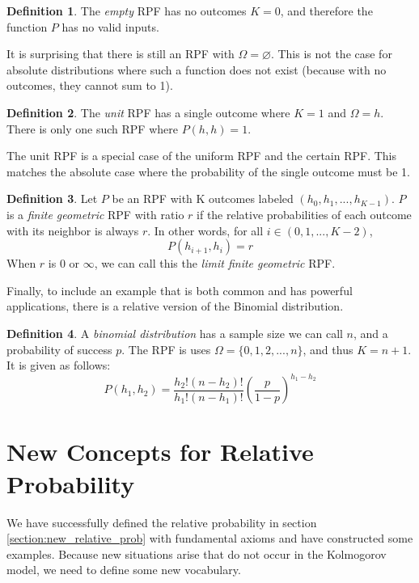 \documentclass[twoside]{article}
\theoremstyle{plain}%
\theoremstyle{definition}
\newtheorem{definition}{Definition}[section]
\theoremstyle{remark}
\begin{document}
\begin{definition}
\label{def:empty_rpf}
The \textit{empty} RPF has no outcomes \(K = 0\), and therefore the function \(P\) has no valid inputs.
\end{definition}

It is surprising that there is still an RPF with \(\Omega = \varnothing\). This is not the case for absolute distributions where such a function does not exist (because with no outcomes, they cannot sum to 1).

\begin{definition}
\label{def:unit_rpf}
The \textit{unit} RPF has a single outcome where \(K = 1\) and \(\Omega = h\). There is only one such RPF where \(P(h, h) = 1\).
\end{definition}

The unit RPF is a special case of the uniform RPF and the certain RPF. This matches the absolute case where the probability of the single outcome must be 1.

\begin{definition}
\label{def:finite_geometric_rpf}
Let \(P\) be an RPF with K outcomes labeled \((h_0, h_1, ..., h_{K-1})\). \(P\) is a \textit{finite geometric} RPF with ratio \(r\) if the relative probabilities of each outcome with its neighbor is always \(r\). In other words, for all \(i \in (0, 1, ..., K-2)\),
\[P(h_{i+1}, h_i) = r\]
When \(r\) is 0 or \(\infty\), we can call this the \textit{limit finite geometric} RPF.
\end{definition}

Finally, to include an example that is both common and has powerful applications, there is a relative version of the Binomial distribution.

\begin{definition}
\label{def:binomial_rpf}
A \textit{binomial distribution} has a sample size we can call \(n\), and a probability of success \(p\). The RPF is uses \(\Omega = \{0, 1, 2, ..., n\}\), and thus \(K = n + 1\). It is given as follows:
\[P(h_1, h_2) = \frac{h_2!(n-h_2)!}{h_1!(n-h_1)!}\left(\frac{p}{1-p}\right)^{h_1 - h_2}\]
\end{definition}

\section{New Concepts for Relative Probability}

We have successfully defined the relative probability in section \ref{section:new_relative_prob} with fundamental axioms and have constructed some examples. Because new situations arise that do not occur in the Kolmogorov model, we need to define some new vocabulary.
\end{document}
